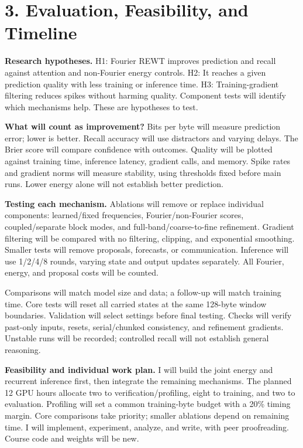 \documentclass[11pt,letterpaper]{article}
\begin{document}
\newpage
\section*{3. Evaluation, Feasibility, and Timeline}

\textbf{Research hypotheses.} H1: Fourier REWT improves prediction and recall against attention and non-Fourier energy controls. H2: It reaches a given prediction quality with less training or inference time. H3: Training-gradient filtering reduces spikes without harming quality. Component tests will identify which mechanisms help. These are hypotheses to test.

\textbf{What will count as improvement?} Bits per byte will measure prediction error; lower is better. Recall accuracy will use distractors and varying delays. The Brier score will compare confidence with outcomes. Quality will be plotted against training time, inference latency, gradient calls, and memory. Spike rates and gradient norms will measure stability, using thresholds fixed before main runs. Lower energy alone will not establish better prediction.

\textbf{Testing each mechanism.} Ablations will remove or replace individual components: learned/fixed frequencies, Fourier/non-Fourier scores, coupled/separate block modes, and full-band/coarse-to-fine refinement. Gradient filtering will be compared with no filtering, clipping, and exponential smoothing. Smaller tests will remove proposals, forecasts, or communication. Inference will use 1/2/4/8 rounds, varying state and output updates separately. All Fourier, energy, and proposal costs will be counted.

Comparisons will match model size and data; a follow-up will match training time. Core tests will reset all carried states at the same 128-byte window boundaries. Validation will select settings before final testing. Checks will verify past-only inputs, resets, serial/chunked consistency, and refinement gradients. Unstable runs will be recorded; controlled recall will not establish general reasoning.

\textbf{Feasibility and individual work plan.} I will build the joint energy and recurrent inference first, then integrate the remaining mechanisms. The planned 12 GPU hours allocate two to verification/profiling, eight to training, and two to evaluation. Profiling will set a common training-byte budget with a 20\% timing margin. Core comparisons take priority; smaller ablations depend on remaining time. I will implement, experiment, analyze, and write, with peer proofreading. Course code and weights will be new.
\end{document}
